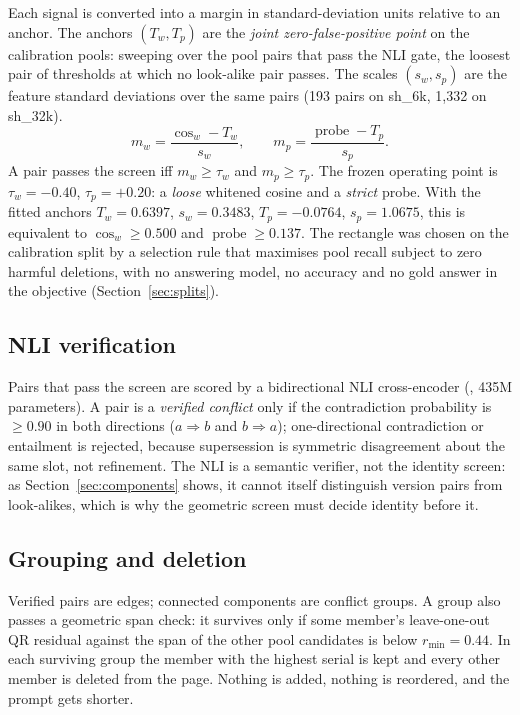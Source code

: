 \documentclass[journal=jcisd8,manuscript=article]{achemso}
\begin{document}
Each signal is converted into a margin in standard-deviation units relative to an anchor. The anchors $(T_w,T_p)$ are the \emph{joint zero-false-positive point} on the calibration pools: sweeping over the pool pairs that pass the NLI gate, the loosest pair of thresholds at which no look-alike pair passes. The scales $(s_w,s_p)$ are the feature standard deviations over the same pairs (193 pairs on sh\_6k, 1,332 on sh\_32k).
\begin{equation}
m_w=\frac{\operatorname{cos}_w-T_w}{s_w},\qquad m_p=\frac{\operatorname{probe}-T_p}{s_p}.
\end{equation}
A pair passes the screen iff $m_w\geq\tau_w$ and $m_p\geq\tau_p$. The frozen operating point is $\tau_w=-0.40$, $\tau_p=+0.20$: a \emph{loose} whitened cosine and a \emph{strict} probe. With the fitted anchors $T_w=0.6397$, $s_w=0.3483$, $T_p=-0.0764$, $s_p=1.0675$, this is equivalent to $\operatorname{cos}_w\geq0.500$ and $\operatorname{probe}\geq0.137$. The rectangle was chosen on the calibration split by a selection rule that maximises pool recall subject to zero harmful deletions, with no answering model, no accuracy and no gold answer in the objective (Section~\ref{sec:splits}).

\subsection{NLI verification}
\label{sec:nli}

Pairs that pass the screen are scored by a bidirectional NLI cross-encoder (, 435M parameters). A pair is a \emph{verified conflict} only if the contradiction probability is $\geq0.90$ in both directions ($a\Rightarrow b$ and $b\Rightarrow a$); one-directional contradiction or entailment is rejected, because supersession is symmetric disagreement about the same slot, not refinement. The NLI is a semantic verifier, not the identity screen: as Section~\ref{sec:components} shows, it cannot itself distinguish version pairs from look-alikes, which is why the geometric screen must decide identity before it.

\subsection{Grouping and deletion}
\label{sec:group}

Verified pairs are edges; connected components are conflict groups. A group also passes a geometric span check: it survives only if some member's leave-one-out QR residual against the span of the other pool candidates is below $r_{\min}=0.44$. In each surviving group the member with the highest serial is kept and every other member is deleted from the page. Nothing is added, nothing is reordered, and the prompt gets shorter.
\end{document}
